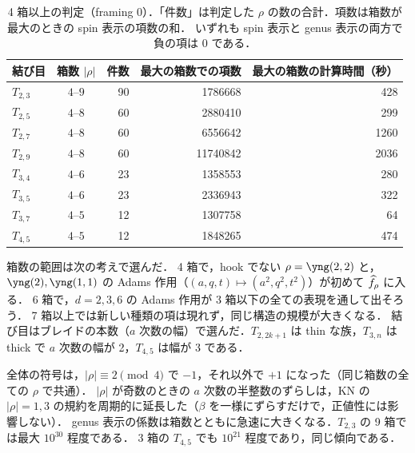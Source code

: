 \begin{table}[h]
\centering
\caption{4 箱以上の判定（framing 0）．「件数」は判定した $\rho$ の数の合計．項数は箱数が最大のときの spin 表示の項数の和．
いずれも spin 表示と genus 表示の両方で負の項は 0 である．}\label{tab:higher}
\begin{tabular}{lcrrr}
\toprule
結び目 & 箱数 $|\rho|$ & 件数 & 最大の箱数での項数 & 最大の箱数の計算時間（秒） \\
\midrule
$T_{2,3}$ & $4$--$9$ & 90 & 1786668 & 428 \\
$T_{2,5}$ & $4$--$8$ & 60 & 2880410 & 299 \\
$T_{2,7}$ & $4$--$8$ & 60 & 6556642 & 1260 \\
$T_{2,9}$ & $4$--$8$ & 60 & 11740842 & 2036 \\
$T_{3,4}$ & $4$--$6$ & 23 & 1358553 & 280 \\
$T_{3,5}$ & $4$--$6$ & 23 & 2336943 & 322 \\
$T_{3,7}$ & $4$--$5$ & 12 & 1307758 & 64 \\
$T_{4,5}$ & $4$--$5$ & 12 & 1848265 & 474 \\
\bottomrule
\end{tabular}
\end{table}

箱数の範囲は次の考えで選んだ．
4 箱で，hook でない $\rho=\yng(2,2)$ と，$\yng(2),\yng(1,1)$ の Adams 作用（$(a,q,t)\mapsto(a^2,q^2,t^2)$）が初めて $\widehat{f}_\rho$ に入る．
6 箱で，$d=2,3,6$ の Adams 作用が 3 箱以下の全ての表現を通して出そろう．
7 箱以上では新しい種類の項は現れず，同じ構造の規模が大きくなる．
結び目はブレイドの本数（$a$ 次数の幅）で選んだ．$T_{2,2k+1}$ は thin な族，$T_{3,n}$ は thick で $a$ 次数の幅が 2，$T_{4,5}$ は幅が 3 である．

\begin{remark}
全体の符号は，$|\rho|\equiv2\pmod 4$ で $-1$，それ以外で $+1$ になった（同じ箱数の全ての $\rho$ で共通）．
$|\rho|$ が奇数のときの $a$ 次数の半整数のずらしは，KN の $|\rho|=1,3$ の規約を周期的に延長した（$\beta$ を一様にずらすだけで，正値性には影響しない）．
genus 表示の係数は箱数とともに急速に大きくなる．$T_{2,3}$ の 9 箱では最大 $10^{30}$ 程度である．
3 箱の $T_{4,5}$ でも $10^{21}$ 程度であり，同じ傾向である．
\end{remark}

